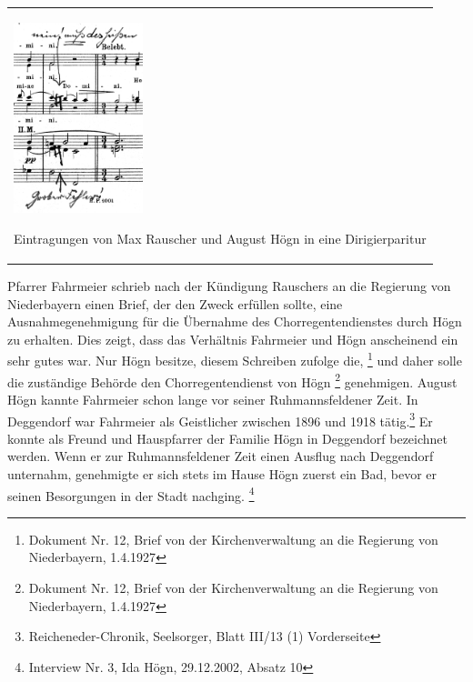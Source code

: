 \begin{center}
\begin{minipage}{4.142cm}
\begin{flushleft}
\tablefirsthead{}
\tablehead{}
\tabletail{}
\tablelasttail{}
\begin{supertabular}{m{3.9420002cm}}

\includegraphics[width=3.759cm,height=5.547cm]{pictures/zulassungsarbeit-img028.png}

\label{bkm:Ref100166968}Eintragungen
von Max Rauscher und August Högn in eine Dirigierparitur\\
\end{supertabular}
\end{flushleft}
\end{minipage}
\end{center}
Pfarrer Fahrmeier schrieb nach der Kündigung Rauschers an die Regierung
von Niederbayern einen Brief, der den Zweck erfüllen sollte, eine
Ausnahmegenehmigung für die Übernahme des Chorregentendienstes durch
Högn zu erhalten. Dies zeigt, dass das Verhältnis Fahrmeier und Högn
anscheinend ein sehr gutes war. Nur Högn besitze, diesem Schreiben
zufolge die, \footnote{
Dokument Nr. 12, Brief von der Kirchenverwaltung an die Regierung von
Niederbayern, 1.4.1927} und daher solle die zuständige Behörde den
Chorregentendienst von Högn  \footnote{Dokument Nr. 12, Brief von der Kirchenverwaltung an die
Regierung von Niederbayern, 1.4.1927} genehmigen. August Högn kannte
Fahrmeier schon lange vor seiner Ruhmannsfeldener Zeit. In Deggendorf
war Fahrmeier als Geistlicher zwischen 1896 und 1918 tätig.\footnote{
Reicheneder-Chronik, Seelsorger, Blatt III/13
(1) Vorderseite} Er konnte als Freund und Hauspfarrer der Familie Högn
in Deggendorf bezeichnet werden. Wenn er zur Ruhmannsfeldener Zeit
einen Ausflug nach Deggendorf unternahm, genehmigte er sich stets im
Hause Högn zuerst ein Bad, bevor er seinen Besorgungen in der Stadt
nachging. \footnote{Interview Nr. 3, Ida Högn, 29.12.2002, Absatz 10}

